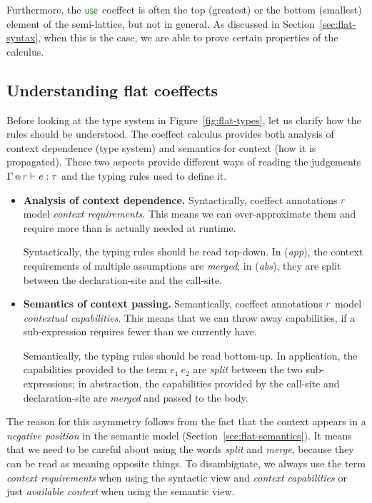 Furthermore, the $\cunit$ coeffect is often the top (greatest) or the bottom (smallest) 
element of the semi-lattice, but not in general. As discussed in Section~\ref{sec:flat-syntax},
when this is the case, we are able to prove certain properties of the calculus.


\subsection{Understanding flat coeffects}
\label{sec:flat-calculus-undestanding}

Before looking at the type system in Figure~\ref{fig:flat-types}, let us clarify how the rules
should be understood. The coeffect calculus provides both analysis of context dependence (type 
system) and semantics for context (how it is propagated). These two aspects provide different
ways of reading the judgements $\coctx{\Gamma}{\cclrd{r}} \vdash e : \tau$ and the typing rules
used to define it.

\begin{itemize}
\item \textbf{Analysis of context dependence.}
Syntactically, coeffect annotations $\cclrd{r}$ model \emph{context requirements}. This means
we can over-approximate them and require more than is actually needed at runtime. 

Syntactically, the typing rules should be read top-down. In (\emph{app}), the context requirements 
of multiple assumptions are \emph{merged}; in (\emph{abs}), they are split between the declaration-site
and the call-site.

\item \textbf{Semantics of context passing.}
Semantically, coeffect annotations $\cclrd{r}$ mo\-del \emph{contextual capabilities}. This means
that we can throw away capabilities, if a sub-expression requires fewer than we 
currently have.

Semantically, the typing rules should be read bottom-up. In application, the capabilities 
provided to the term $e_1~e_2$ are \emph{split} between the two sub-expressions; in abstraction,
the capabilities provided by the call-site and declaration-site are \emph{merged} and passed
to the body.
\end{itemize}

The reason for this asymmetry follows from the fact that the context appears in a \emph{negative
position} in the semantic model (Section~\ref{sec:flat-semantics}). It means that we need to be
careful about using the words \emph{split} and \emph{merge}, because they can be read as meaning
opposite things. To disambiguate, we always use the term \emph{context requirements} when using
the syntactic view and \emph{context capabilities} or just \emph{available context} when using 
the semantic view.

